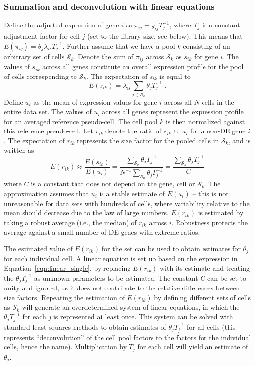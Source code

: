 \documentclass{bmcart}
\begin{document}
\subsubsection*{Summation and deconvolution with linear equations}
Define the adjusted expression of gene $i$ as $\pi_{ij} = y_{ij}T_j^{-1}$, where $T_j$ is a constant adjustment factor for cell $j$ (set to the library size, see below).
This means that $E(\pi_{ij}) =\theta_j\lambda_{is} T_j^{-1}$.
Further assume that we have a pool $k$ consisting of an arbitrary set of cells $\mathcal{S}_k$.
Denote the sum of $\pi_{ij}$ across $\mathcal{S}_k$ as $s_{ik}$ for gene $i$.
The values of $s_{ik}$ across all genes constitute an overall expression profile for the pool of cells corresponding to $\mathcal{S}_k$.
The expectation of $s_{ik}$ is equal to 
\[
    E(s_{ik}) = \lambda_{is} \sum_{j \in \mathcal{S}_k} \theta_j T_j^{-1}\;.
\]
Define $u_{i}$ as the mean of expression values for gene $i$ across all $N$ cells in the entire data set.
The values of $u_{i}$ across all genes represent the expression profile for an averaged reference pseudo-cell.
The cell pool $k$ is then normalized against this reference pseudo-cell.
Let $r_{ik}$ denote the ratio of $s_{ik}$ to $u_{i}$ for a non-DE gene $i$.
The expectation of $r_{ik}$ represents the size factor for the pooled cells in $\mathcal{S}_k$, and is written as
\begin{equation}
    E(r_{ik}) \approx \frac{E(s_{ik})}{E(u_{i})} 
    = \frac{\sum_{\mathcal{S}_k} \theta_j T_j^{-1}}{ N^{-1} \sum_{\mathcal{S}_0} \theta_j T_j^{-1}} 
    = \frac{\sum_{\mathcal{S}_k} \theta_j T_j^{-1}}{C}
    \label{eqn:linear_single}
\end{equation}
where $C$ is a constant that does not depend on the gene, cell or $\mathcal{S}_k$.
The approximation assumes that $u_{i}$ is a stable estimate of $E(u_i)$ 
    -- this is not unreasonable for data sets with hundreds of cells, where variability relative to the mean should decrease due to the law of large numbers.
$E(r_{ik})$ is estimated by taking a robust average (i.e., the median) of $r_{ik}$ across $i$.
Robustness protects the average against a small number of DE genes with extreme ratios.

The estimated value of $E(r_{ik})$ for the set can be used to obtain estimates for $\theta_j$ for each individual cell.
A linear equation is set up based on the expression in Equation~\ref{eqn:linear_single}, 
by replacing $E(r_{ik})$ with its estimate and treating the $\theta_j T_j^{-1}$ as unknown parameters to be estimated.
The constant $C$ can be set to unity and ignored, as it does not contribute to the relative differences between size factors.
Repeating the estimation of $E(r_{ik})$ by defining different sets of cells as $\mathcal{S}_{k}$ will generate an overdetermined system of linear equations, 
    in which the $\theta_j T_j^{-1}$ for each $j$ is represented at least once.
This system can be solved with standard least-squares methods to obtain estimates of $\theta_j T_j^{-1}$ for all cells 
    (this represents ``deconvolution'' of the cell pool factors to the factors for the individual cells, hence the name).
Multiplication by $T_j$ for each cell will yield an estimate of $\theta_j$.
\end{document}
